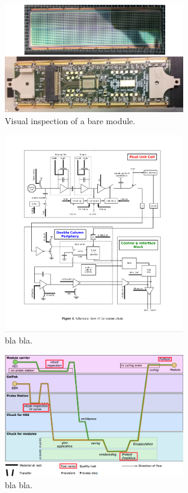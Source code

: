 \begin{figure}[!h]
  \centering
  \includegraphics[width=0.7\textwidth]{../images/ch7/bbm_hdi}
  \caption[Visual inspection of a bare module.]{Visual inspection of a bare module.}\label{fig:vis_insp}
\end{figure}





\begin{figure}[!h]
  \centering
  \includegraphics[width=0.7\textwidth]{../images/ch7/pix_unit_cell}
  \caption[bla for index.]{bla bla.}\label{fig:pix_unit_cell}
\end{figure}



\begin{figure}[!h]
  \centering
  \includegraphics[width=0.7\textwidth]{../images/ch7/unl_workflow2}
  \caption[bla for index.]{bla bla.}\label{fig:unl_workflow2}
\end{figure}

















